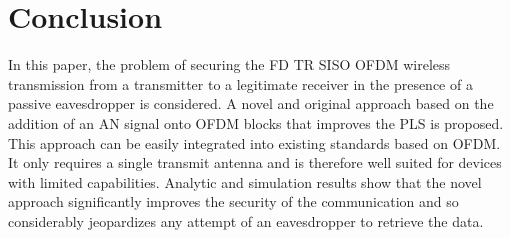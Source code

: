 \documentclass[a4paper,11pt]{article}
\begin{document}

\section{Conclusion}
In this paper, the problem of securing the FD TR SISO OFDM wireless transmission from a transmitter to a legitimate receiver in the presence of a passive eavesdropper is considered. A novel and original approach based on the addition of an AN signal onto OFDM blocks that improves the PLS is proposed. This approach can be easily integrated into existing standards based on OFDM. It only requires a single transmit antenna and is therefore well suited for devices with limited capabilities. Analytic and simulation results show that the novel approach significantly improves the security of the communication and so considerably jeopardizes any attempt of an eavesdropper to retrieve the data.
\label{sec:ccl}
\end{document}

